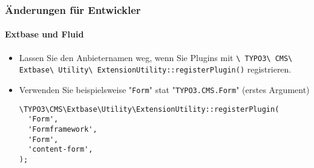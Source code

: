 \begin{frame}[fragile]
	\frametitle{Änderungen für Entwickler}
	\framesubtitle{Extbase und Fluid}

	\lstset{basicstyle=\smaller\ttfamily}

	\begin{itemize}
		\item Lassen Sie den Anbieternamen weg, wenn Sie Plugins mit\newline
			\smaller
				\texttt{\textbackslash
					TYPO3\textbackslash
					CMS\textbackslash
					Extbase\textbackslash
					Utility\textbackslash
					ExtensionUtility::registerPlugin()} registrieren.
			\normalsize

		\item Verwenden Sie beispielsweise "\texttt{Form}" stat "\texttt{TYPO3.CMS.Form}"\newline
			\small(erstes Argument)\normalsize

\begin{lstlisting}
\TYPO3\CMS\Extbase\Utility\ExtensionUtility::registerPlugin(
  'Form',
  'Formframework',
  'Form',
  'content-form',
);
\end{lstlisting}

	\end{itemize}

\end{frame}


